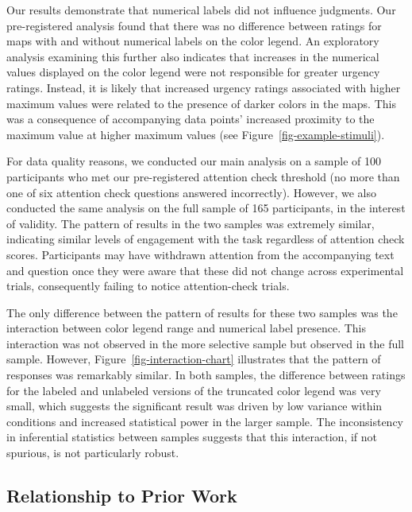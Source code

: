 \documentclass[
]{interact}
\begin{document}
Our results demonstrate that numerical labels did not influence
judgments. Our pre-registered analysis found that there was no
difference between ratings for maps with and without numerical labels on
the color legend. An exploratory analysis examining this further also
indicates that increases in the numerical values displayed on the color
legend were not responsible for greater urgency ratings. Instead, it is
likely that increased urgency ratings associated with higher maximum
values were related to the presence of darker colors in the maps. This
was a consequence of accompanying data points' increased proximity to
the maximum value at higher maximum values (see
Figure~\ref{fig-example-stimuli}).

For data quality reasons, we conducted our main analysis on a sample of
100 participants who met our pre-registered attention check threshold
(no more than one of six attention check questions answered
incorrectly). However, we also conducted the same analysis on the full
sample of 165 participants, in the interest of validity. The pattern of
results in the two samples was extremely similar, indicating similar
levels of engagement with the task regardless of attention check scores.
Participants may have withdrawn attention from the accompanying text and
question once they were aware that these did not change across
experimental trials, consequently failing to notice attention-check
trials.

The only difference between the pattern of results for these two samples
was the interaction between color legend range and numerical label
presence. This interaction was not observed in the more selective sample
but observed in the full sample. However,
Figure~\ref{fig-interaction-chart} illustrates that the pattern of
responses was remarkably similar. In both samples, the difference
between ratings for the labeled and unlabeled versions of the truncated
color legend was very small, which suggests the significant result was
driven by low variance within conditions and increased statistical power
in the larger sample. The inconsistency in inferential statistics
between samples suggests that this interaction, if not spurious, is not
particularly robust.

\hypertarget{relationship-to-prior-work}{%
\subsection{Relationship to Prior
Work}\label{relationship-to-prior-work}}
\end{document}
